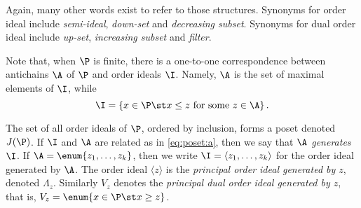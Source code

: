 Again, many other words exist to refer to those structures. Synonyms for
order ideal include \emph{semi-ideal}, \emph{down-set} and
\emph{decreasing subset}. Synonyms for dual order ideal include
\emph{up-set}, \emph{increasing subset} and \emph{filter}.

Note that, when $\P$ is finite, there is a one-to-one correspondence between
antichains $\A$ of $\P$ and order ideals $\I$. Namely, $\A$ is the set of maximal
elements of $\I$, while
\begin{equation}
\label{eq:poset:a}
\I = \left\{{x \in \P \st x \le z ~\text{for some}~ z \in \A}\right\}.
\end{equation}

The set of all order ideals of $\P$, ordered by inclusion, forms a poset denoted
$J(\P)$. If $\I$ and $\A$ are related as in \ref{eq:poset:a}, then we say that
\emph{$\A$ generates $\I$}. If $\A = \enum{z_1 , \ldots , z_k}$, then we
write $\I = \langle z_1 , \ldots , z_k \rangle$ for the order ideal generated by
$\A$. The order ideal $\langle z \rangle$ is the \emph{principal order ideal
generated by $z$}, denoted $\Lambda_z$. Similarly $V_z$ denotes the \emph{principal
dual order ideal generated by $z$}, that is, $V_z = \enum{x \in \P \st x \ge z}$.
